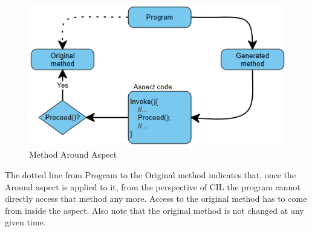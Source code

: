 \begin{figure}[H]
  \includegraphics[scale=1.0]{AroundOverview.PNG}
  \centering
  \caption{Method Around Aspect\label{around_overview}}
\end{figure}

The dotted line from Program to the Original method indicates that, once the Around aspect is applied to it, from the perspective of CIL the program cannot directly access that method any more. Access to the original method has to come from inside the aspect. Also note that the original method is not changed at any given time.
